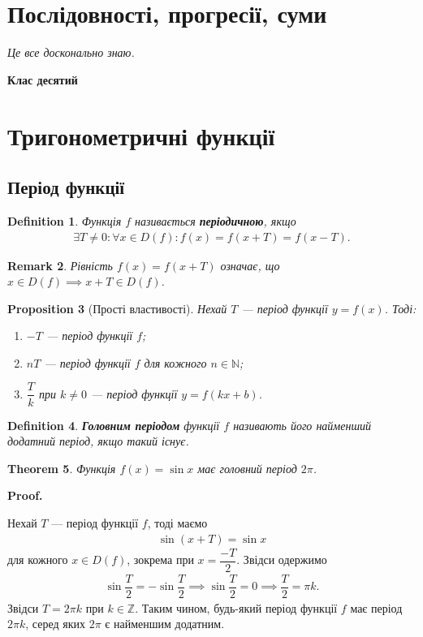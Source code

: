 \documentclass[a4paper, 10pt]{article}
\makeatletter
\def\qed{$\blacksquare$}
\theoremstyle{theoremdd}
\newtheorem{theorem}{Theorem}[subsection]
\theoremstyle{theoremdd}
\newtheorem{definition}[theorem]{Definition}
\theoremstyle{theoremdd}
\theoremstyle{theoremdd}
\theoremstyle{theoremdd}
\newtheorem{proposition}[theorem]{Proposition}
\theoremstyle{theoremdd}
\newtheorem{remark}[theorem]{Remark}
\theoremstyle{theoremdd}
\theoremstyle{theoremdd}
\renewenvironment{proof}[1][Proof.\\]{\par
\pushQED{\hfill \qed}%
\normalfont \topsep6\p@\@plus6\p@\relax
\trivlist
\item\relax
{\bfseries
#1\@addpunct{.}}\hspace\labelsep\ignorespaces
}{%
\popQED\endtrivlist\@endpefalse
}
\makeatother
\begin{document}
\section{Послідовності, прогресії, суми}
\textit{Це все досконально знаю.}
\newpage

{\Huge \textbf{Клас десятий}}
\section{Тригонометричні функції}
\subsection{Період функції}
\begin{definition}
Функція $f$ називається \textbf{періодичною}, якщо
\begin{align*}
\exists T \neq 0: \forall x \in D(f): f(x) = f(x+T) = f(x-T).
\end{align*}
\end{definition}

\begin{remark}
Рівність $f(x) = f(x+T)$ означає, що $x \in D(f) \implies x+T \in D(f)$.
\end{remark}

\begin{proposition}[Прості властивості]
Нехай $T$ --- період функції $y = f(x)$. Тоді:
\begin{enumerate}[nosep,wide=0pt,label={\arabic*)}]
\item $-T$ --- період функції $f$;
\item $nT$ --- період функції $f$ для кожного $n \in \mathbb{N}$;
\item $\dfrac{T}{k}$ при $k \neq 0$ --- період функції $y = f(kx+b)$.
\end{enumerate}
\end{proposition}

\begin{definition}
\textbf{Головним періодом} функції $f$ називають його найменший додатний період, якщо такий існує.
\end{definition}

\begin{theorem}
Функція $f(x) = \sin x$ має головний період $2\pi$. 
\end{theorem}

\begin{proof}
Нехай $T$ --- період функції $f$, тоді маємо
\begin{align*}
\sin (x+T) = \sin x
\end{align*}
для кожного $x \in D(f)$, зокрема при $x = \dfrac{-T}{2}$. Звідси одержимо
\begin{align*}
\sin \dfrac{T}{2} = - \sin \dfrac{T}{2} \implies \sin \dfrac{T}{2} = 0 \implies \dfrac{T}{2} = \pi k.
\end{align*}
Звідси $T = 2\pi k$ при $k \in \mathbb{Z}$. Таким чином, будь-який період функції $f$ має період $2\pi k$, серед яких $2\pi$ є найменшим додатним.
\end{proof}
\end{document}
